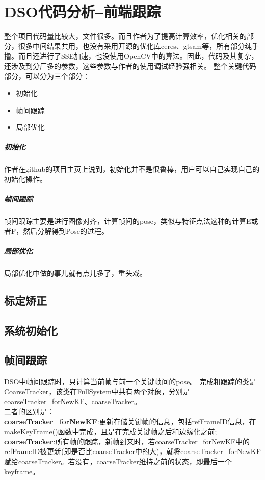 \chapter{DSO代码分析--前端跟踪}

整个项目代码量比较大，文件很多。而且作者为了提高计算效率，优化相关的部分，很多中间结果共用，也没有采用开源的优化库ceres、gtsam等，所有部分纯手撸。而且还进行了SSE加速，也没使用OpenCV中的算法。因此，代码及其复杂，还涉及到分厂多的参数，这些参数与作者的使用调试经验强相关。
整个关键代码部分，可以分为三个部分：
\begin{itemize}
	\item  初始化
	\item  帧间跟踪
	\item  局部优化
\end{itemize} 
\paragraph{初始化} 作者在github的项目主页上说到，初始化并不是很鲁棒，用户可以自己实现自己的初始化操作。
\paragraph{帧间跟踪} 帧间跟踪主要是进行图像对齐，计算帧间的pose，类似与特征点法这种的计算E或者F，然后分解得到Pose的过程。
\paragraph{局部优化} 局部优化中做的事儿就有点儿多了，重头戏。


\section{标定矫正}


\section{系统初始化}


\section{帧间跟踪}	
\vspace{0.2em}
DSO中帧间跟踪时，只计算当前帧与前一个关键帧间的pose。
\indent 完成粗跟踪的类是CoarseTracker，该类在FullSystem中共有两个对象，分别是coarseTracker\_forNewKF、coarseTracker。\\
二者的区别是：\\
\textbf{coarseTracker\_forNewKF}:更新存储关键帧的信息，包括refFrameID信息，在makeKeyFrame()函数中完成，且是在完成关键帧之后和边缘化之前;\\
\textbf{coarseTracker}:所有帧的跟踪，新帧到来时，若coarseTracker\_forNewKF中的refFrameID被更新(即是否比coarseTracker中的大)，就将coarseTracker\_forNewKF赋给coarseTracker。若没有，coarseTracker维持之前的状态，即最后一个keyframe。





